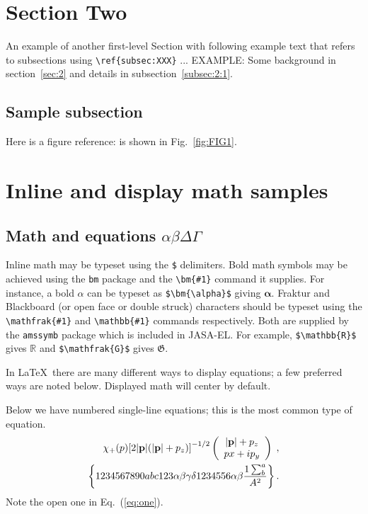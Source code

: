\documentclass{JASA-EL}
\begin{document}
\section{\label{sec:2} Section Two}

An example of another first-level Section with following example text that refers to subsections using 
\verb+\ref{subsec:XXX}+ ...  EXAMPLE: Some background in
section~\ref{sec:2} and details  in subsection~\ref{subsec:2:1}. 

\subsection{\label{subsec:2:1} Sample subsection}
Here is a figure reference: is shown in Fig.~\ref{fig:FIG1}.

\section{Inline and display math samples\label{sec:3}}

\subsection{\label{subsec:3:3} Math and equations $\alpha\beta\Delta\Gamma$}
Inline math may be typeset using the \verb+$+ delimiters. Bold math
symbols may be achieved using the \verb+bm+ package and the
\verb+\bm{#1}+ command it supplies. For instance, a bold $\alpha$ can
be typeset as \verb+$\bm{\alpha}$+ giving $\bm{\alpha}$. Fraktur and
Blackboard (or open face or double struck) characters should be
typeset using the \verb+\mathfrak{#1}+ and \verb+\mathbb{#1}+ commands
respectively. Both are supplied by the \texttt{amssymb} package which
is included in JASA-EL. For
example, \verb+$\mathbb{R}$+ gives $\mathbb{R}$ and
\verb+$\mathfrak{G}$+ gives $\mathfrak{G}$.

In \LaTeX\ there are many different ways to display equations; a
few preferred ways are noted below. Displayed math will center by
default. 

Below we have numbered single-line equations; this is the most common
type of equation.
\begin{eqnarray}
\chi_+(p){\bf [}2|{\bf p}|(|{\bf p}|+p_z){\bf ]}^{-1/2}
\left(
\begin{array}{c}
|{\bf p}|+p_z\\
px+ip_y
\end{array}\right)\;,
\\
\left\{%
 1234567890abc123\alpha\beta\gamma\delta1234556\alpha\beta
 \frac{1\sum^{a}_{b}}{A^2}%
\right\}%
\label{eq:one}.
\end{eqnarray}
Note the open one in Eq.~(\ref{eq:one}).
\end{document}
